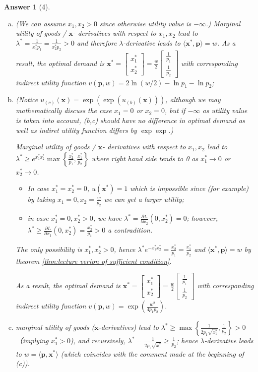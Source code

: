 \documentclass{article}
\newtheorem*{ans}{Answer}
\newcommand{\1}{{\bf 1}}
\newcommand{\0}{{\mathbf{0}}}
\newcommand{\p}{{\mathbf{p}}}
\newcommand{\x}{{\mathbf{x}}}
\newcommand{\<}{\langle}
\renewcommand{\>}{\rangle}
\begin{document}
\begin{ans}[4]
\begin{enumerate}[(a)]
		\item (We can assume $x_1,x_2 >0$ since otherwise utility value is $-\infty$.) Marginal utility of goods / $\x$- derivatives with respect to $x_1,x_2$ lead to $\lambda^* = \frac1{x_1^*p_1} = \frac1{x_2^*p_2 }>0$ and therefore $\lambda$-derivative leads to $\langle \x^* , \p 	\rangle = w$. As a result,  the optimal demand is $\x^* = \begin{bmatrix} x_1^* \\ x_2^* \end{bmatrix}  = \frac{w}2 \begin{bmatrix}
		\frac1{p_1} \\ \frac1{p_2} \end{bmatrix}$ with corresponding indirect utility function $v(\p,w) =  2 \ln \left(w /2\right) - \ln p_1 - \ln p_2$;
		\item  (Notice $u_{(c)}(\x)= \exp\left( \exp\left(u_{(b)}(\x) \right) \right)$, although we may mathematically discuss the case $x_1=0$ or $x_2=0$, but if $-\infty$ as utility value is taken into account, (b,c) should have no difference in optimal demand as well as indiret utility function differs by $\exp\exp$.)
		
		
		Marginal utility of goods / $\x$- derivatives with respect to $x_1,x_2$ lead to $\lambda^* \ge  e^{  x_1^*x_2^*}\max\left\{ \frac{x_2^*}{p_1}, \frac{x_1^*}{p_2} \right\}$ where right hand side tends to 0 as $x_1^* \to 0$ or $x_2^* \to 0$.
		\begin{itemize}
			\item In case $x_1^* =x_2^*= 0$, $u(\x^*) = 1$ which is impossible since (for example) by taking $x_1 = 0, x_2 = \frac{w}{p_2}$ we can get a larger utility;
			\item in case $x_1^* = 0, x_2^* >0$, we have $\lambda^* =  \frac{\partial L}{\partial x_2}(0,x_2^*)=0$; however, $\lambda^* \ge  \frac{\partial L}{\partial x_1}(0,x_2^*)=\frac{x_2^*}{p_1} >0$ a contradition.
		\end{itemize}
	The only possibility is $x_1^* ,x_2^* >0$, hence $\lambda^*  e^{ -  x_1^*x_2^*}  =   \frac{x_2^*}{p_1} = \frac{x_1^*}{p_2} $ and $\langle \x^* , \p 	\rangle = w$ by theorem \ref{thm:lecture verion of sufficient condition}. 
		
		
		As a result,  the optimal demand is $\x^* = \begin{bmatrix} x_1^* \\ x_2^* \end{bmatrix}  = \frac{w}2 \begin{bmatrix}
		\frac1{p_1} \\ \frac1{p_2} \end{bmatrix}$ with corresponding indirect utility function $v(\p,w) =  \exp\left(\frac{w^2}{4 p_1   p_2}\right)$.
		\item  marginal utility of goods ($\x$-derivatives) lead to $\lambda^* \ge \max \left\{\frac1{2 p_1\sqrt{x_1^*}}, \frac1{p_2} \right\} >0$ （implying $x_1^* >0$), and recursively, $\lambda^* = \frac1{2 p_1\sqrt{x_1^*}} \ge \frac1{p_2 }$; hence $\lambda$-derivative leads to $ w = \langle \p ,\x^* \rangle $ (which coincides with the comment made at the beginning of (c)). 
		

\end{enumerate}
\end{ans}
\end{document}
